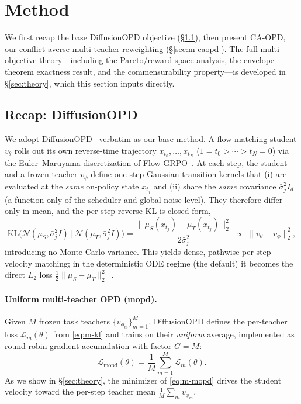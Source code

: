\section{Method}
\label{sec:method}

We first recap the base DiffusionOPD objective (\S\ref{sec:m-recap}), then
present CA-OPD, our conflict-averse multi-teacher reweighting
(\S\ref{sec:m-caopd}). The full multi-objective theory---including the
Pareto/reward-space analysis, the envelope-theorem exactness result, and the
commensurability property---is developed in \S\ref{sec:theory}, which this
section inputs directly.

\subsection{Recap: DiffusionOPD}
\label{sec:m-recap}

We adopt DiffusionOPD~\cite{li2026diffusionopd} verbatim as our base method. A
flow-matching student $v_\theta$ rolls out its own reverse-time trajectory
$x_{t_0},\dots,x_{t_N}$ ($1{=}t_0{>}\cdots{>}t_N{=}0$) via the Euler--Maruyama
discretization of Flow-GRPO~\cite{liu2025flow}. At each step, the student and a
frozen teacher $v_\phi$ define one-step Gaussian transition kernels that (i) are
evaluated at the \emph{same} on-policy state $x_{t_j}$ and (ii) share the
\emph{same} covariance $\bar\sigma_j^2 I_d$ (a function only of the scheduler and
global noise level). They therefore differ only in mean, and the per-step reverse
KL is closed-form,
\begin{equation}
\label{eq:m-kl}
\mathrm{KL}\!\bigl(\mathcal N(\mu_S,\bar\sigma_j^2 I)\,\Vert\,\mathcal N(\mu_T,\bar\sigma_j^2 I)\bigr)
=\frac{\|\mu_S(x_{t_j})-\mu_T(x_{t_j})\|_2^2}{2\bar\sigma_j^2}
\;\propto\;\|v_\theta-v_\phi\|_2^2 ,
\end{equation}
introducing no Monte-Carlo variance. This yields dense, pathwise per-step
velocity matching; in the deterministic ODE regime (the default) it becomes the
direct $L_2$ loss $\tfrac12\|\mu_S-\mu_T\|_2^2$~\cite{li2026diffusionopd}.

\paragraph{Uniform multi-teacher OPD (mopd).}
Given $M$ frozen task teachers $\{v_{\phi_m}\}_{m=1}^M$, DiffusionOPD defines the
per-teacher loss $\mathcal L_m(\theta)$ from \eqref{eq:m-kl} and trains on their
\emph{uniform} average, implemented as round-robin gradient accumulation with
factor $G=M$:
\begin{equation}
\label{eq:m-mopd}
\mathcal L_{\mathrm{mopd}}(\theta)=\frac1M\sum_{m=1}^M \mathcal L_m(\theta).
\end{equation}
As we show in \S\ref{sec:theory}, the minimizer of \eqref{eq:m-mopd} drives the
student velocity toward the per-step teacher mean $\tfrac1M\sum_m v_{\phi_m}$.

